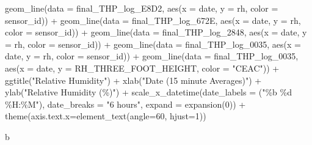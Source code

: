 \documentclass[
  letterpaper,
  DIV=11,
  numbers=noendperiod]{scrartcl}
\newenvironment{Shaded}{\begin{snugshade}}{\end{snugshade}}
\newcommand{\AttributeTok}[1]{\textcolor[rgb]{0.40,0.45,0.13}{#1}}
\newcommand{\DecValTok}[1]{\textcolor[rgb]{0.68,0.00,0.00}{#1}}
\newcommand{\FunctionTok}[1]{\textcolor[rgb]{0.28,0.35,0.67}{#1}}
\newcommand{\NormalTok}[1]{\textcolor[rgb]{0.00,0.23,0.31}{#1}}
\newcommand{\SpecialCharTok}[1]{\textcolor[rgb]{0.37,0.37,0.37}{#1}}
\newcommand{\StringTok}[1]{\textcolor[rgb]{0.13,0.47,0.30}{#1}}
\begin{document}
\begin{Shaded}
\begin{Highlighting}[]
    \FunctionTok{geom\_line}\NormalTok{(}\AttributeTok{data =}\NormalTok{ final\_THP\_log\_E8D2, }\FunctionTok{aes}\NormalTok{(}\AttributeTok{x =}\NormalTok{ date, }\AttributeTok{y =}\NormalTok{ rh, }\AttributeTok{color =}\NormalTok{ sensor\_id)) }\SpecialCharTok{+}
    \FunctionTok{geom\_line}\NormalTok{(}\AttributeTok{data =}\NormalTok{ final\_THP\_log\_672E, }\FunctionTok{aes}\NormalTok{(}\AttributeTok{x =}\NormalTok{ date, }\AttributeTok{y =}\NormalTok{ rh, }\AttributeTok{color =}\NormalTok{ sensor\_id)) }\SpecialCharTok{+}
    \FunctionTok{geom\_line}\NormalTok{(}\AttributeTok{data =}\NormalTok{ final\_THP\_log\_2848, }\FunctionTok{aes}\NormalTok{(}\AttributeTok{x =}\NormalTok{ date, }\AttributeTok{y =}\NormalTok{ rh, }\AttributeTok{color =}\NormalTok{ sensor\_id)) }\SpecialCharTok{+}
    \FunctionTok{geom\_line}\NormalTok{(}\AttributeTok{data =}\NormalTok{ final\_THP\_log\_0035, }\FunctionTok{aes}\NormalTok{(}\AttributeTok{x =}\NormalTok{ date, }\AttributeTok{y =}\NormalTok{ rh, }\AttributeTok{color =}\NormalTok{ sensor\_id)) }\SpecialCharTok{+}
    \FunctionTok{geom\_line}\NormalTok{(}\AttributeTok{data =}\NormalTok{ final\_THP\_log\_0035, }\FunctionTok{aes}\NormalTok{(}\AttributeTok{x =}\NormalTok{ date, }\AttributeTok{y =}\NormalTok{ RH\_THREE\_FOOT\_HEIGHT, }\AttributeTok{color =} \StringTok{"CEAC"}\NormalTok{)) }\SpecialCharTok{+}
    \FunctionTok{ggtitle}\NormalTok{(}\StringTok{"Relative Humidity"}\NormalTok{) }\SpecialCharTok{+}
    \FunctionTok{xlab}\NormalTok{(}\StringTok{"Date (15 minute Averages)"}\NormalTok{) }\SpecialCharTok{+}
    \FunctionTok{ylab}\NormalTok{(}\StringTok{"Relative Humidity (\%)"}\NormalTok{) }\SpecialCharTok{+}
      \FunctionTok{scale\_x\_datetime}\NormalTok{(}\AttributeTok{date\_labels =}\NormalTok{ (}\StringTok{"\%b \%d \%H:\%M"}\NormalTok{),}
      \AttributeTok{date\_breaks =} \StringTok{"6 hours"}\NormalTok{,  }\AttributeTok{expand =} \FunctionTok{expansion}\NormalTok{(}\DecValTok{0}\NormalTok{)) }\SpecialCharTok{+}
    \FunctionTok{theme}\NormalTok{(}\AttributeTok{axis.text.x=}\FunctionTok{element\_text}\NormalTok{(}\AttributeTok{angle=}\DecValTok{60}\NormalTok{, }\AttributeTok{hjust=}\DecValTok{1}\NormalTok{))}

\NormalTok{    b}
\end{Highlighting}
\end{Shaded}
\end{document}
